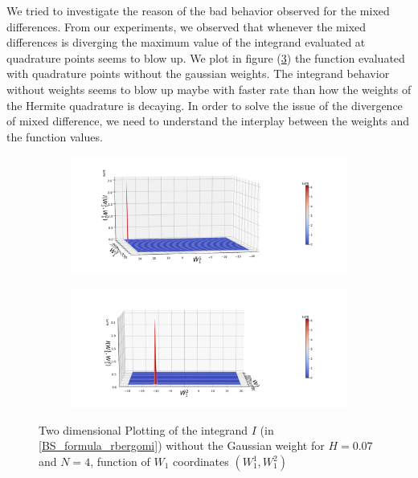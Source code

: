 \documentclass[11pt]{article}
\begin{document}
	

We tried to investigate the reason of the bad behavior observed for the mixed differences. From our experiments, we observed that whenever the mixed differences is diverging the maximum value of the integrand evaluated at quadrature points seems to blow up. We plot in figure (\ref{fig:Two dimensional Plotting of the integrand $I$_W12_view})  the function evaluated with quadrature points without the gaussian weights. The integrand behavior without weights seems to blow up maybe with faster rate than how the weights of the Hermite quadrature is decaying. In order to solve the issue of the divergence of mixed difference, we need to understand the interplay between  the weights and the function values.


\begin{figure}[h!]
	\centering
	\begin{subfigure}{.4\textwidth}
		\centering
			\includegraphics[width=1\linewidth]{./figures/integrand_plotting_rBergomi/2D_plots/N_4/integrand_without_density/H_007/Bergomi_integrand_contours_K_1_H_007_W1_1_2_N_4_without_weights_2_80}
		\caption{}
		\label{fig:sub3}
	\end{subfigure}%
	\begin{subfigure}{.4\textwidth}
		\centering
		\includegraphics[width=1\linewidth]{./figures/integrand_plotting_rBergomi/2D_plots/N_4/integrand_without_density/H_007/Bergomi_integrand_contours_K_1_H_007_W1_1_2_N_4_without_weights_2_0}
		\caption{}
		\label{fig:sub4}
	\end{subfigure}
	
	
	
	\caption{Two dimensional Plotting of the integrand $I$ (in \eqref{BS_formula_rbergomi}) without the Gaussian weight  for $H=0.07$ and $N=4$, function of $W_1$ coordinates $(W_1^1,W^2_1)$}
	\label{fig:Two dimensional Plotting of the integrand $I$_W12_view}
\end{figure}
\end{document}
